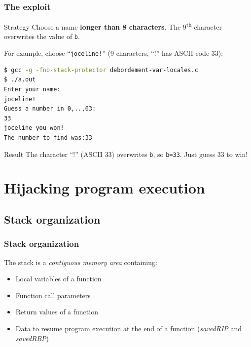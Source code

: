 \documentclass{beamer}
\newcommand{\enlight}[1]{\textit{\color{blue}#1}}
\begin{document}
\begin{frame}[fragile]
\frametitle{The exploit}

\begin{block}{Strategy}
Choose a name \textbf{longer than 8 characters}. The 9\textsuperscript{th} character overwrites the value of \texttt{b}.
\end{block}

For example, choose ``\texttt{joceline!}'' (9 characters, ``!'' has ASCII code 33):

\begin{lstlisting}[language=bash]
$ gcc -g -fno-stack-protector debordement-var-locales.c
$ ./a.out
Enter your name:
joceline!
Guess a number in 0,..,63:
33
joceline you won!
The number to find was:33
\end{lstlisting}

\begin{alertblock}{Result}
The character ``!'' (ASCII 33) overwrites \texttt{b}, so \texttt{b=33}. Just guess 33 to win!
\end{alertblock}

\end{frame}


\section{Hijacking program execution}

\subsection{Stack organization}

\begin{frame}
\frametitle{Stack organization}

The stack is a \enlight{contiguous memory area} containing:
\begin{itemize}
\item Local variables of a function
\item Function call parameters
\item Return values of a function
\item Data to resume program execution at the end of a function (\enlight{savedRIP} and \enlight{savedRBP})
\end{itemize}

\end{frame}
\end{document}
